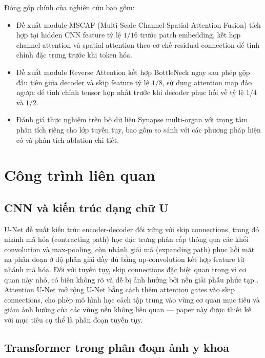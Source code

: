 \documentclass[10pt,a4paper]{article}
\begin{document}
Đóng góp chính của nghiên cứu bao gồm:
\begin{itemize}[nosep,leftmargin=1.5em]
    \item Đề xuất module MSCAF (Multi-Scale Channel-Spatial Attention Fusion) tích hợp tại hidden CNN feature tỷ lệ $1/16$ trước patch embedding, kết hợp channel attention và spatial attention theo cơ chế residual connection \cite{he2016resnet} để tinh chỉnh đặc trưng trước khi token hóa.
    \item Đề xuất module Reverse Attention kết hợp BottleNeck \cite{li2024rtaformer} ngay sau phép gộp đầu tiên giữa decoder và skip feature tỷ lệ $1/8$, sử dụng attention map đảo ngược để tinh chỉnh tensor hợp nhất trước khi decoder phục hồi về tỷ lệ $1/4$ và $1/2$.
    \item Đánh giá thực nghiệm trên bộ dữ liệu Synapse multi-organ với trọng tâm phân tích riêng cho lớp tuyến tụy, bao gồm so sánh với các phương pháp hiện có và phân tích ablation chi tiết.
\end{itemize}

\section{Công trình liên quan}

\subsection{CNN và kiến trúc dạng chữ U}

U-Net \cite{ronneberger2015unet} đề xuất kiến trúc encoder-decoder đối xứng với skip connections, trong đó nhánh mã hóa (contracting path) học đặc trưng phân cấp thông qua các khối convolution và max-pooling, còn nhánh giải mã (expanding path) phục hồi mặt nạ phân đoạn ở độ phân giải đầy đủ bằng up-convolution kết hợp feature từ nhánh mã hóa. Đối với tuyến tụy, skip connections đặc biệt quan trọng vì cơ quan này nhỏ, có biên không rõ và dễ bị ảnh hưởng bởi nền giải phẫu phức tạp \cite{yu2018rstn,moglia2025pancreasreview}. Attention U-Net \cite{oktay2018attentionunet} mở rộng U-Net bằng cách thêm attention gates vào skip connections, cho phép mô hình học cách tập trung vào vùng cơ quan mục tiêu và giảm ảnh hưởng của các vùng nền không liên quan --- paper này được thiết kế với mục tiêu cụ thể là phân đoạn tuyến tụy.

\subsection{Transformer trong phân đoạn ảnh y khoa}
\end{document}
